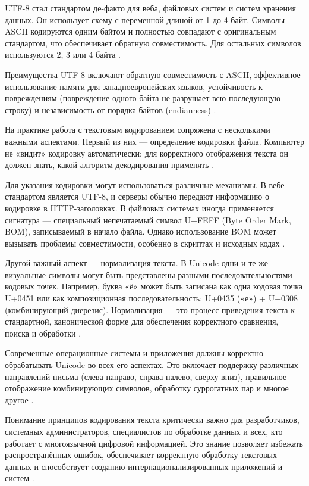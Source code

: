 \documentclass{SibFU-docs}
\begin{document}
UTF-8 стал стандартом де-факто для веба, файловых систем и систем хранения данных. Он использует схему с переменной длиной от 1 до 4 байт. Символы ASCII кодируются одним байтом и полностью совпадают с оригинальным стандартом, что обеспечивает обратную совместимость. Для остальных символов используются 2, 3 или 4 байта \cite{rfc3629}.

Преимущества UTF-8 включают обратную совместимость с ASCII, эффективное использование памяти для западноевропейских языков, устойчивость к повреждениям (повреждение одного байта не разрушает всю последующую строку) и независимость от порядка байтов (endianness) \cite{w3c2024}.


На практике работа с текстовым кодированием сопряжена с несколькими важными аспектами. Первый из них — определение кодировки файла. Компьютер не «видит» кодировку автоматически; для корректного отображения текста он должен знать, какой алгоритм декодирования применять \cite{unicode2024}.

Для указания кодировки могут использоваться различные механизмы. В вебе стандартом является UTF-8, и серверы обычно передают информацию о кодировке в HTTP-заголовках. В файловых системах иногда применяется сигнатура — специальный непечатаемый символ U+FEFF (Byte Order Mark, BOM), записываемый в начало файла. Однако использование BOM может вызывать проблемы совместимости, особенно в скриптах и исходных кодах \cite{iana2024}.

Другой важный аспект — нормализация текста. В Unicode одни и те же визуальные символы могут быть представлены разными последовательностями кодовых точек. Например, буква «ё» может быть записана как одна кодовая точка U+0451 или как композиционная последовательность: U+0435 («е») + U+0308 (комбинирующий диерезис). Нормализация — это процесс приведения текста к стандартной, канонической форме для обеспечения корректного сравнения, поиска и обработки \cite{w3c2024}.

Современные операционные системы и приложения должны корректно обрабатывать Unicode во всех его аспектах. Это включает поддержку различных направлений письма (слева направо, справа налево, сверху вниз), правильное отображение комбинирующих символов, обработку суррогатных пар и многое другое \cite{tanenbaum2015}.

Понимание принципов кодирования текста критически важно для разработчиков, системных администраторов, специалистов по обработке данных и всех, кто работает с многоязычной цифровой информацией. Это знание позволяет избежать распространённых ошибок, обеспечивает корректную обработку текстовых данных и способствует созданию интернационализированных приложений и систем \cite{knut2020, petzold2001}.
\end{document}
